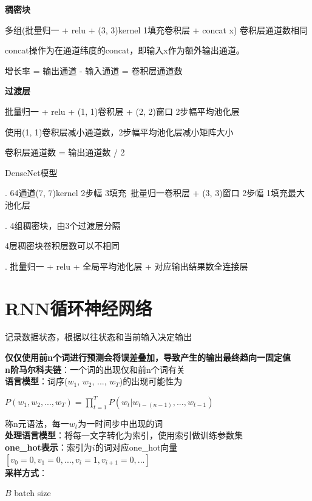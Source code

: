 \documentclass[UTF8]{ctexart}
\begin{document}
  \textbf{稠密块}

  \quad 多组(批量归一 + relu + (3, 3)kernel 1填充卷积层 + concat x) 卷积层通道数相同

  \quad concat操作为在通道纬度的concat，即输入x作为额外输出通道。

  \quad 增长率 = 输出通道 - 输入通道 = 卷积层通道数

  \textbf{过渡层}

  \quad 批量归一 + relu + (1, 1)卷积层 + (2, 2)窗口 2步幅平均池化层
  
  \quad 使用(1, 1)卷积层减小通道数，2步幅平均池化层减小矩阵大小

  \quad \quad 卷积层通道数 = 输出通道数 / 2

  DenseNet模型

  . 64通道(7, 7)kernel 2步幅 3填充\ 批量归一卷积层 + (3, 3)窗口 2步幅 1填充最大池化层

  . 4组稠密块，由3个过渡层分隔

  \quad \quad 4层稠密块卷积层数可以不相同

  . 批量归一 + relu + 全局平均池化层 + 对应输出结果数全连接层

\section{RNN循环神经网络}

\noindent 记录数据状态，根据以往状态和当前输入决定输出

  \textbf{仅仅使用前n个词进行预测会将误差叠加，导致产生的输出最终趋向一固定值}\\
\textbf{n阶马尔科夫链}：一个词的出现仅和前n个词有关\\
\textbf{语言模型}：词序($w_1$, $w_2$, ..., $w_T$)的出现可能性为

  $P(w_1, w_2,...,w_T) = \prod_{t=1}^{T} P(w_t|w_{t-(n-1)},...,w_{t-1})$

  称n元语法，每一$w_t$为一时间步中出现的词\\
\textbf{处理语言模型}：将每一文字转化为索引，使用索引做训练参数集\\
\textbf{one\_hot表示}：索引为$i$的词对应one\_hot向量$[v_0 = 0, v_1 = 0, ..., v_i = 1, v_{i+1} = 0, ...]$\\
\textbf{采样方式}：

  $B$ batch size
  
\end{document}
